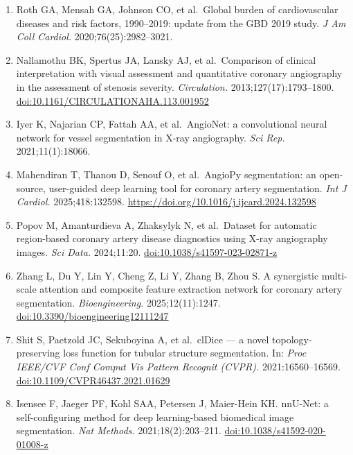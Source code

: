 \documentclass[12pt]{article}
\begin{document}
\begin{enumerate}
\item Roth GA, Mensah GA, Johnson CO, et al.\ Global burden of cardiovascular
  diseases and risk factors, 1990--2019: update from the GBD 2019 study.
  \textit{J Am Coll Cardiol.} 2020;76(25):2982--3021.

\item Nallamothu BK, Spertus JA, Lansky AJ, et al.\ Comparison of clinical
  interpretation with visual assessment and quantitative coronary angiography
  in the assessment of stenosis severity.
  \textit{Circulation.} 2013;127(17):1793--1800.
  \url{doi:10.1161/CIRCULATIONAHA.113.001952}

\item Iyer K, Najarian CP, Fattah AA, et al.\ AngioNet: a convolutional neural
  network for vessel segmentation in X-ray angiography.
  \textit{Sci Rep.} 2021;11(1):18066.

\item Mahendiran T, Thanou D, Senouf O, et al.\ AngioPy segmentation: an
  open-source, user-guided deep learning tool for coronary artery segmentation.
  \textit{Int J Cardiol.} 2025;418:132598.
  \url{https://doi.org/10.1016/j.ijcard.2024.132598}

\item Popov M, Amanturdieva A, Zhaksylyk N, et al.\ Dataset for automatic
  region-based coronary artery disease diagnostics using X-ray angiography
  images. \textit{Sci Data.} 2024;11:20.
  \url{doi:10.1038/s41597-023-02871-z}

\item Zhang L, Du Y, Lin Y, Cheng Z, Li Y, Zhang B, Zhou S. A synergistic
  multi-scale attention and composite feature extraction network for coronary
  artery segmentation. \textit{Bioengineering.} 2025;12(11):1247.
  \url{doi:10.3390/bioengineering12111247}

\item Shit S, Paetzold JC, Sekuboyina A, et al.\ clDice --- a novel
  topology-preserving loss function for tubular structure segmentation.
  In: \textit{Proc IEEE/CVF Conf Comput Vis Pattern Recognit (CVPR).}
  2021:16560--16569. \url{doi:10.1109/CVPR46437.2021.01629}

\item Isensee F, Jaeger PF, Kohl SAA, Petersen J, Maier-Hein KH\@.
  nnU-Net: a self-configuring method for deep learning-based biomedical
  image segmentation. \textit{Nat Methods.} 2021;18(2):203--211.
  \url{doi:10.1038/s41592-020-01008-z}
\end{enumerate}
\end{document}
